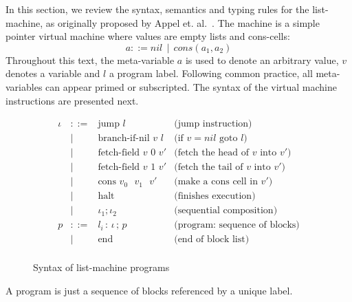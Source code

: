 \documentclass[review]{elsarticle}
\theoremstyle{definition}
\begin{document}
In this section, we review the syntax, semantics and typing rules for the
list-machine, as originally proposed by Appel et. al.~\cite{AppelDL12}.
The machine is a simple pointer virtual machine where values
are empty lists and cons-cells:
\[
a ::= nil\,\mid\,cons(a_1,a_2)
\]
Throughout this text, the meta-variable $a$ is used to denote an arbitrary value, $v$ denotes a variable
and $l$ a program label. Following common practice, all meta-variables can
appear primed or subscripted. The syntax of the virtual machine instructions are
presented next.
\begin{figure}[H]
\[
\begin{array}{rcll}
  \iota & ::=  & \text{jump }l                       & \text{(jump instruction)}\\
        & \mid & \text{branch-if-nil $v$~$l$}            & \text{(if $v = nil$ goto $l$)}\\
        & \mid & \text{fetch-field $v$ 0 $v'$}       & \text{(fetch the head of $v$ into $v'$)}\\
        & \mid & \text{fetch-field  $v$ 1 $v'$}      & \text{(fetch the tail of $v$ into $v'$)}\\
        & \mid & \text{cons $v_0$ $v_1$ $v'$}        & \text{(make a cons cell in $v'$)} \\
        & \mid & \text{halt}                         & \text{(finishes execution)}\\
        & \mid & \iota_1;\iota_2                             & \text{(sequential composition)}\\
      p & ::=  & l_i \,:\,\iota\,;\,p                    & \text{(program: sequence of blocks)}\\
        & \mid & \text{end}                          & \text{(end of block list)}\\
\end{array}
\]
\centering
\caption{Syntax of list-machine programs}
\label{fig:list-syntax}
\end{figure}
A program is just a sequence of blocks referenced by a unique label.
\end{document}
